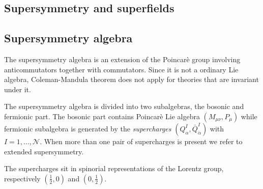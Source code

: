 \begin{appendices}

\chapter{Supersymmetry and superfields}
\label{appendice_susy}






\section{Supersymmetry algebra}
The supersymmetry algebra is an extension of the Poincarè group involving anticommutators together with commutators.
Since it is not a ordinary Lie algebra, Coleman-Mandula theorem does not apply for theories that are invariant under it.


The supersymmetry algebra is divided into two subalgebras, the bosonic and fermionic part.
The bosonic part contains Poincarè Lie algebra $(M_{\mu \nu}, P_{\mu})$ while fermionic subalgebra is generated by the \emph{supercharges} $(Q_{\alpha}^I, \bar{Q}_{\dot{\alpha}}^I)$ with $I = 1, \ldots , \mathcal{N} $. 
When more than one pair of supercharges is present we refer to extended supersymmetry.

The supercharges sit in spinorial representations of the Lorentz group, respectively $(\frac{1}{2},0) $ and $(0,\frac{1}{2}) $.


\end{appendices}
